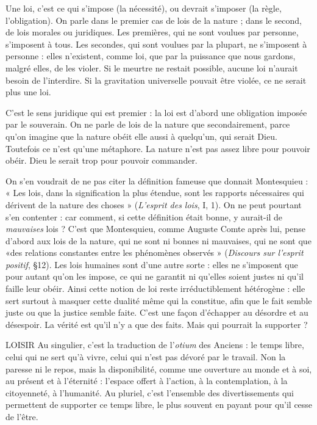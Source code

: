 {Une loi, c’est ce qui s'impose (la nécessité), ou devrait s'imposer (la règle,
l'obligation). On parle dans le premier cas de lois de la nature ; dans le second,
de lois morales ou juridiques. Les premières, qui ne sont voulues par personne,
s'imposent à tous. Les secondes, qui sont voulues par la plupart, ne s'imposent
à personne : elles n’existent, comme loi, que par la puissance que nous gardons,
malgré elles, de les violer. Si le meurtre ne restait possible, aucune loi n’aurait
besoin de l’interdire. Si la gravitation universelle pouvait être violée, ce ne serait
plus une loi.

C’est le sens juridique qui est premier : la loi est d’abord une obligation
imposée par le souverain. On ne parle de lois de la nature que secondairement,
parce qu’on imagine que la nature obéit elle aussi à quelqu'un, qui serait Dieu.
Toutefois ce n’est qu’une métaphore. La nature n’est pas assez libre pour pouvoir
obéir. Dieu le serait trop pour pouvoir commander.

On s’en voudrait de ne pas citer la définition fameuse que donnait
Montesquieu : « Les lois, dans la signification la plus étendue, sont les rapports
nécessaires qui dérivent de la nature des choses » ({\it L'esprit des lois}, I, 1). On ne
peut pourtant s’en contenter : car comment, si cette définition était bonne, y
aurait-il de {\it mauvaises} lois ? C’est que Montesquieu, comme Auguste Comte
après lui, pense d’abord aux lois de la nature, qui ne sont ni bonnes ni mauvaises,
qui ne sont que «des relations constantes entre les phénomènes
observés » ({\it Discours sur l'esprit positif}, \S 12). Les lois humaines sont d’une autre
sorte : elles ne s'imposent que pour autant qu’on les impose, ce qui ne garantit
ni qu’elles soient justes ni qu’il faille leur obéir. Ainsi cette notion de loi reste
irréductiblement hétérogène : elle sert surtout à masquer cette dualité même
qui la constitue, afin que le fait semble juste ou que la justice semble faite. C’est
une façon d’échapper au désordre et au désespoir. La vérité est qu’il n’y a que
des faits. Mais qui pourrait la supporter ?

LOISIR Au singulier, c’est la traduction de l’{\it otium} des Anciens : le temps
libre, celui qui ne sert qu’à vivre, celui qui n’est pas dévoré par le
travail. Non la paresse ni le repos, mais la disponibilité, comme une ouverture
au monde et à soi, au présent et à l'éternité : l’espace offert à l’action, à la
contemplation, à la citoyenneté, à l'humanité.
Au pluriel, c’est l’ensemble des divertissements qui permettent de supporter
ce temps libre, le plus souvent en payant pour qu’il cesse de l’être.

}
